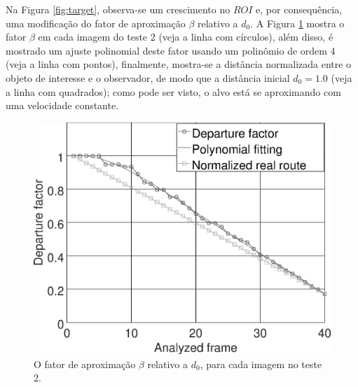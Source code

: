 Na Figura \ref{fig:target}, observa-se um crescimento no $ROI$ e, por
consequência, uma modificação do fator de aproximação $\beta$ relativo a $d_0$.
A Figura \ref{fig:res_grapha_b} mostra o fator $\beta$ em cada imagem 
do teste 2 (veja a linha com círculos),
além disso, é mostrado um ajuste polinomial deste fator usando 
um polinômio de ordem 4 (veja a linha com pontos),
finalmente, mostra-se a distância normalizada entre o objeto de interesse e o observador,
de modo que a distância inicial $d_0=1.0$ (veja a linha com quadrados);
como pode ser visto, o alvo está se aproximando com uma velocidade constante.
\begin{figure}[H]
\includegraphics[width=\columnwidth]{images/grapha_b.eps}
\caption{O fator de aproximação $\beta$ relativo a $d_0$, para cada imagem no teste 2.}
\label{fig:res_grapha_b}
\end{figure}


